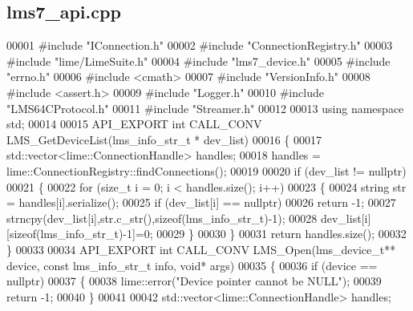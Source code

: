 \subsection{lms7\+\_\+api.\+cpp}
\label{lms7__api_8cpp_source}

\begin{DoxyCode}
00001 \textcolor{preprocessor}{#include "IConnection.h"}
00002 \textcolor{preprocessor}{#include "ConnectionRegistry.h"}
00003 \textcolor{preprocessor}{#include "lime/LimeSuite.h"}
00004 \textcolor{preprocessor}{#include "lms7_device.h"}
00005 \textcolor{preprocessor}{#include "errno.h"}
00006 \textcolor{preprocessor}{#include <cmath>}
00007 \textcolor{preprocessor}{#include "VersionInfo.h"}
00008 \textcolor{preprocessor}{#include <assert.h>}
00009 \textcolor{preprocessor}{#include "Logger.h"}
00010 \textcolor{preprocessor}{#include "LMS64CProtocol.h"}
00011 \textcolor{preprocessor}{#include "Streamer.h"}
00012 
00013 \textcolor{keyword}{using namespace }std;
00014 
00015 API_EXPORT \textcolor{keywordtype}{int} CALL_CONV LMS_GetDeviceList(lms_info_str_t * dev\_list)
00016 \{
00017     std::vector<lime::ConnectionHandle> handles;
00018     handles = lime::ConnectionRegistry::findConnections();
00019 
00020     \textcolor{keywordflow}{if} (dev\_list != \textcolor{keyword}{nullptr})
00021     \{
00022         \textcolor{keywordflow}{for} (\textcolor{keywordtype}{size\_t} i = 0; i < handles.size(); i++)
00023         \{
00024             \textcolor{keywordtype}{string} str = handles[i].serialize();
00025             \textcolor{keywordflow}{if} (dev\_list[i] == \textcolor{keyword}{nullptr})
00026                 \textcolor{keywordflow}{return} -1;
00027             strncpy(dev\_list[i],str.c\_str(),\textcolor{keyword}{sizeof}(lms_info_str_t)-1);
00028             dev\_list[i][\textcolor{keyword}{sizeof}(lms_info_str_t)-1]=0;
00029         \}
00030     \}
00031     \textcolor{keywordflow}{return} handles.size();
00032 \}
00033 
00034 API_EXPORT \textcolor{keywordtype}{int} CALL_CONV LMS_Open(lms_device_t** device, \textcolor{keyword}{const} lms_info_str_t 
      info, \textcolor{keywordtype}{void}* args)
00035 \{
00036     \textcolor{keywordflow}{if} (device == \textcolor{keyword}{nullptr})
00037     \{
00038         lime::error(\textcolor{stringliteral}{"Device pointer cannot be NULL"});
00039         \textcolor{keywordflow}{return} -1;
00040     \}
00041 
00042     std::vector<lime::ConnectionHandle> handles;

\end{DoxyCode}
